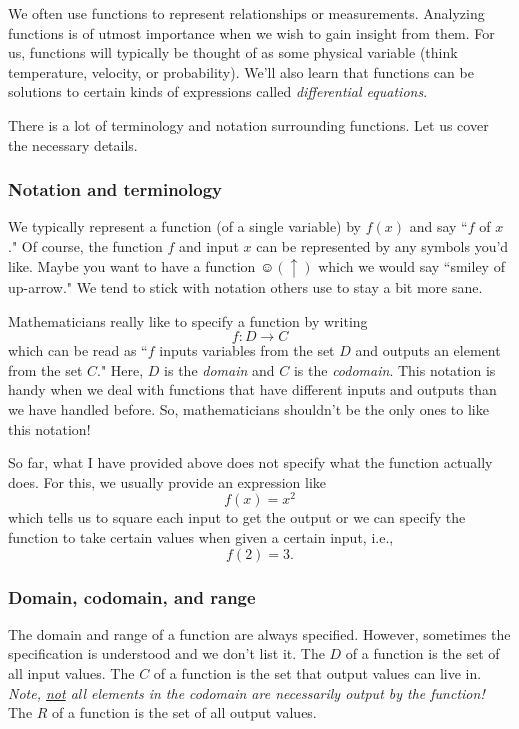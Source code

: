     We often use functions to represent relationships or measurements.  Analyzing functions is of utmost importance when we wish to gain insight from them.  For us, functions will typically be thought of as some physical variable (think temperature, velocity, or probability). We'll also learn that functions can be solutions to certain kinds of expressions called \emph{differential equations}.  
    
    There is a lot of terminology and notation surrounding functions. Let us cover the necessary details. 
    
    \subsubsection{Notation and terminology}
    
    We typically represent a function (of a single variable) by $f(x)$ and say ``$f$ of $x$." Of course, the function $f$ and input $x$ can be represented by any symbols you'd like.  Maybe you want to have a function $\smiley(\uparrow)$ which we would say ``smiley of up-arrow." We tend to stick with notation others use to stay a bit more sane.
    
    Mathematicians really like to specify a function by writing
    \[
    f\colon D \to C
    \]
    which can be read as ``$f$ inputs variables from the set $D$ and outputs an element from the set $C$." Here, $D$ is the \emph{domain} and $C$ is the \emph{codomain}. This notation is handy when we deal with functions that have different inputs and outputs than we have handled before. So, mathematicians shouldn't be the only ones to like this notation!
    
    So far, what I have provided above does not specify what the function actually does.  For this, we usually provide an expression like
    \[
    f(x)=x^2
    \]
    which tells us to square each input to get the output or we can specify the function to take certain values when given a certain input, i.e.,
    \[
    f(2)=3.
    \]
    
    
    \subsubsection{Domain, codomain, and range}
    
    The domain and range of a function are always specified. However, sometimes the specification is understood and we don't list it.  The  $D$ of a function is the set of all input values.  The  $C$ of a function is the set that output values can live in.  \emph{Note, \underline{not} all elements in the codomain are necessarily output by the function!} The  $R$ of a function is the set of all output values.  
    
